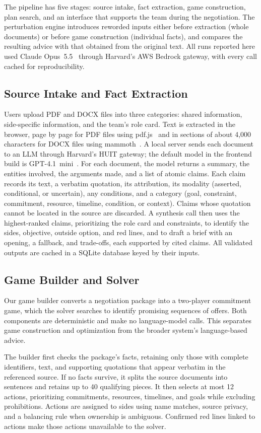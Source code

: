 \documentclass[10pt,twocolumn,letterpaper]{article}
\begin{document}
The pipeline has five stages: source intake, fact extraction, game construction, plan search, and an interface that supports the team during the negotiation. The perturbation engine introduces reworded inputs either before extraction (whole documents) or before game construction (individual facts), and compares the resulting advice with that obtained from the original text. All runs reported here used Claude Opus~5.5~\cite{opus} through Harvard's AWS Bedrock gateway, with every call cached for reproducibility.

\subsection{Source Intake and Fact Extraction}
Users upload PDF and DOCX files into three categories: shared information, side-specific information, and the team's role card. Text is extracted in the browser, page by page for PDF files using pdf.js~\cite{pdfjs} and in sections of about 4,000 characters for DOCX files using mammoth~\cite{mammoth}. A local server sends each document to an LLM through Harvard's HUIT gateway; the default model in the frontend build is GPT-4.1~mini~\cite{gpt41}. For each document, the model returns a summary, the entities involved, the arguments made, and a list of atomic claims. Each claim records its text, a verbatim quotation, its attribution, its modality (asserted, conditional, or uncertain), any conditions, and a category (goal, constraint, commitment, resource, timeline, condition, or context). Claims whose quotation cannot be located in the source are discarded. A synthesis call then uses the highest-ranked claims, prioritizing the role card and constraints, to identify the sides, objective, outside option, and red lines, and to draft a brief with an opening, a fallback, and trade-offs, each supported by cited claims. All validated outputs are cached in a SQLite database keyed by their inputs.

\subsection{Game Builder and Solver}
Our game builder converts a negotiation package into a two-player commitment game, which the solver searches to identify promising sequences of offers. Both components are deterministic and make no language-model calls. This separates game construction and optimization from the broader system's language-based advice.

The builder first checks the package's facts, retaining only those with complete identifiers, text, and supporting quotations that appear verbatim in the referenced source. If no facts survive, it splits the source documents into sentences and retains up to 40 qualifying pieces. It then selects at most 12 actions, prioritizing commitments, resources, timelines, and goals while excluding prohibitions. Actions are assigned to sides using name matches, source privacy, and a balancing rule when ownership is ambiguous. Confirmed red lines linked to actions make those actions unavailable to the solver.
\end{document}

